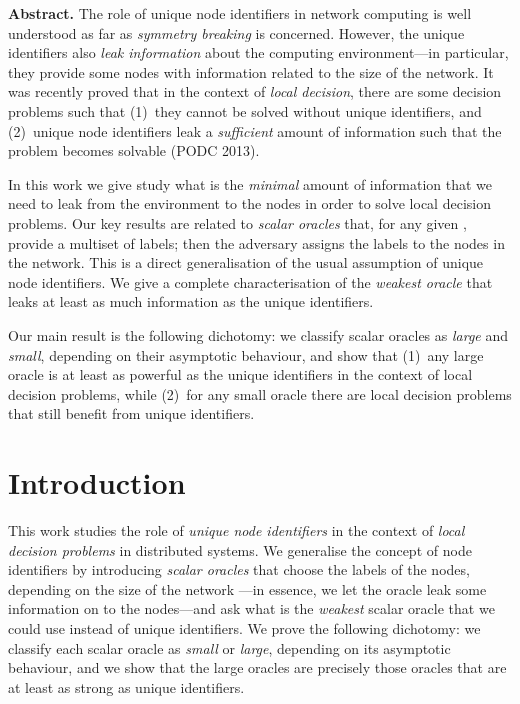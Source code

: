 \documentclass[11pt,a4paper]{article}
\theoremstyle{definition}
\theoremstyle{remark}
\newenvironment{myabstract}
               {\list{}{\listparindent 1.5em\itemindent    \listparindent
                        \leftmargin    0pt
                        \rightmargin   0pt
                        \parsep        0pt}\item\relax}
               {\endlist}
\begin{document}
\bigskip
\begin{myabstract}
\noindent\textbf{Abstract.}
The role of unique node identifiers in network computing is well understood as far as \emph{symmetry breaking} is concerned. However, the unique identifiers also \emph{leak information} about the computing environment---in particular, they provide some nodes with information related to the size of the network. It was recently proved that in the context of \emph{local decision}, there are some decision problems such that (1)~they cannot be solved without unique identifiers, and (2)~unique node identifiers leak a \emph{sufficient} amount of information such that the problem becomes solvable (PODC 2013).

In this work we give study what is the \emph{minimal} amount of information that we need to leak from the environment to the nodes in order to solve local decision problems. Our key results are related to \emph{scalar oracles}  that, for any given , provide a multiset  of  labels; then the adversary assigns the labels to the  nodes in the network. This is a direct generalisation of the usual assumption of unique node identifiers. We give a complete characterisation of the \emph{weakest oracle} that leaks at least as much information as the unique identifiers.

Our main result is the following dichotomy: we classify scalar oracles as \emph{large} and \emph{small}, depending on their asymptotic behaviour, and show that (1)~any large oracle is at least as powerful as the unique identifiers in the context of local decision problems, while (2)~for any small oracle there are local decision problems that still benefit from unique identifiers.
\end{myabstract}

\thispagestyle{empty}
\setcounter{page}{0}
\newpage

\section{Introduction}

This work studies the role of \emph{unique node identifiers} in the context of \emph{local decision problems} in distributed systems. We generalise the concept of node identifiers by introducing \emph{scalar oracles} that choose the labels of the nodes, depending on the size of the network ---in essence, we let the oracle leak some information on  to the nodes---and ask what is the \emph{weakest} scalar oracle that we could use instead of unique identifiers. We prove the following dichotomy: we classify each scalar oracle as \emph{small} or \emph{large}, depending on its asymptotic behaviour, and we show that the large oracles are precisely those oracles that are at least as strong as unique identifiers.
\end{document}
